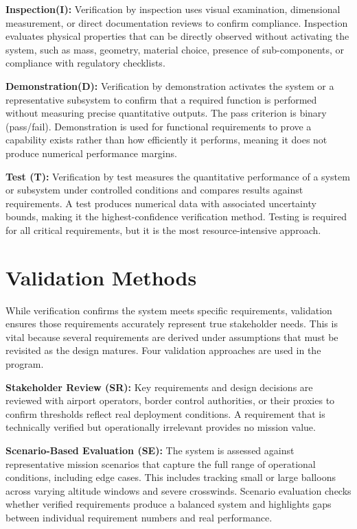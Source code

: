 \textbf{Inspection(I): }Verification by inspection uses visual examination, dimensional measurement, or direct documentation reviews to confirm compliance. Inspection evaluates physical properties that can be directly observed without activating the system, such as mass, geometry, material choice, presence of sub-components, or compliance with regulatory checklists.


\textbf{Demonstration(D): }Verification by demonstration activates the system or a representative subsystem to confirm that a required function is performed without measuring precise quantitative outputs. The pass criterion is binary (pass/fail). Demonstration is used for functional requirements to prove a capability exists rather than how efficiently it performs, meaning it does not produce numerical performance margins.

\textbf{Test (T): }Verification by test measures the quantitative performance of a system or subsystem under controlled conditions and compares results against requirements. A test produces numerical data with associated uncertainty bounds, making it the highest-confidence verification method. Testing is required for all critical requirements, but it is the most resource-intensive approach.

\section{Validation Methods}
\label{sec:valmet}

While verification confirms the system meets specific requirements, validation ensures those requirements accurately represent true stakeholder needs. This is vital because several requirements are derived under assumptions that must be revisited as the design matures. Four validation approaches are used in the program.

\textbf{Stakeholder Review (SR): }Key requirements and design decisions are reviewed with airport operators, border control authorities, or their proxies to confirm thresholds reflect real deployment conditions. A requirement that is technically verified but operationally irrelevant provides no mission value.


\textbf{Scenario-Based Evaluation (SE): }The system is assessed against representative mission scenarios that capture the full range of operational conditions, including edge cases. This includes tracking small or large balloons across varying altitude windows and severe crosswinds. Scenario evaluation checks whether verified requirements produce a balanced system and highlights gaps between individual requirement numbers and real performance.

